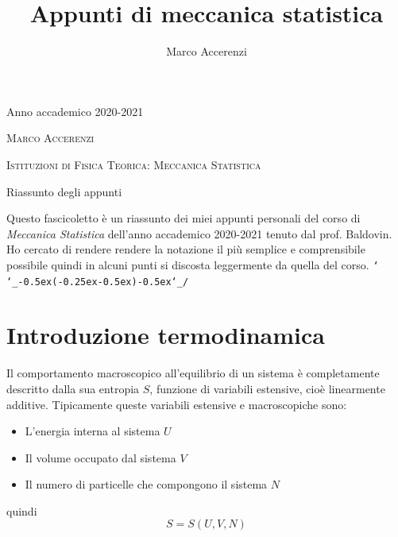 \documentclass[11pt,a4paper,twoside]{book}
\author{Marco Accerenzi}
\date{}
\title{Appunti di meccanica statistica}
\numberwithin{equation}{section} %
\def\shrug{\texttt{\raisebox{0.75em}{\char`\_}\char`\\\char`\_\kern-0.5ex(\kern-0.25ex\raisebox{0.25ex}{\rotatebox{45}{\raisebox{-.75ex}"\kern-1.5ex\rotatebox{-90})}}\kern-0.5ex)\kern-0.5ex\char`\_/\raisebox{0.75em}{\char`\_}}}
\begin{document}

\frontmatter
\pagestyle{empty}

\begin{titlepage}
	\begin{center}

	\begin{center}
		\centering
		Anno accademico 2020-2021\par
		\vspace{.05\textheight}
	\end{center}	

		\vspace{.1\textheight}
		{\LARGE\scshape \textsc{Marco Accerenzi}\par}
		\vspace{.1\textheight}
		\textsc{}\par
		\vspace{.05\textheight}
		{\Huge \textsc{Istituzioni di Fisica Teorica: Meccanica Statistica}\par}
		\vspace{.05\textheight}
		{\large Riassunto degli appunti\par}
		\vfill
		{\large
Questo fascicoletto è un riassunto dei miei appunti personali del corso di \textit{Meccanica Statistica} dell'anno accademico 2020-2021 tenuto dal prof. Baldovin. \\Ho cercato di rendere rendere la notazione il più semplice e comprensibile possibile quindi in alcuni punti si discosta leggermente da quella del corso. \shrug

  }
  \vspace{2cm} 
\end{center}
\end{titlepage}

\tableofcontents\thispagestyle{empty}
\mainmatter\pagestyle{fancy}
\section{Introduzione termodinamica}

Il comportamento macroscopico all'equilibrio di un sistema è completamente descritto dalla sua entropia $S$, funzione di variabili estensive, cioè linearmente additive. Tipicamente queste variabili estensive e macroscopiche sono: \begin{itemize}[label=$\cdot$]
\item L'energia interna al sistema $U$
\item Il volume occupato dal sistema $V$
\item Il numero di particelle che compongono il sistema $N$
\end{itemize}
quindi
\begin{equation}
S=S(U,V,N)
\end{equation}
\end{document}
